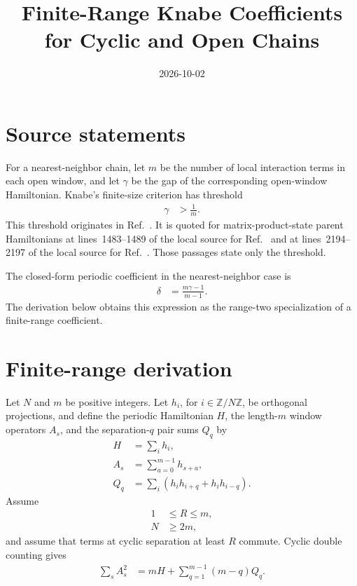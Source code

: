 \documentclass{article}
\title{Finite-Range Knabe Coefficients for Cyclic and Open Chains}
\author{}
\date{2026-10-02}
\begin{document}
\maketitle
{}

\section{Source statements}

For a nearest-neighbor chain, let $m$ be the number of local interaction
terms in each open window, and let $\gamma$ be the gap of the corresponding
open-window Hamiltonian. Knabe's finite-size criterion has threshold
\begin{align}
    \gamma
        &>\frac{1}{m}.
    \label{eq:knabe88_finite_range_coefficient_knabe_threshold}
\end{align}
This threshold originates in Ref.~\cite{Knabe1988Energy}. It is quoted for
matrix-product-state parent Hamiltonians at lines~1483--1489 of the local
source for Ref.~\cite{PerezGarcia2007Matrix} and at lines~2194--2197 of the
local source for Ref.~\cite{Cirac2021Matrix}. Those passages state only the
threshold.

The closed-form periodic coefficient in the nearest-neighbor case is
\begin{align}
    \delta
        &=\frac{m\gamma-1}{m-1}.
    \label{eq:knabe88_finite_range_coefficient_nearest_neighbor_coefficient}
\end{align}
The derivation below obtains this expression as the range-two specialization
of a finite-range coefficient.

\section{Finite-range derivation}

Let $N$ and $m$ be positive integers. Let $h_i$, for
$i\in\mathbb Z/N\mathbb Z$, be orthogonal projections, and define the
periodic Hamiltonian $H$, the length-$m$ window operators $A_s$, and the
separation-$q$ pair sums $Q_q$ by
\begin{align}
    H
        &=\sum_i h_i,
    \label{eq:knabe88_finite_range_coefficient_periodic_hamiltonian}\\
    A_s
        &=\sum_{a=0}^{m-1}h_{s+a},
    \label{eq:knabe88_finite_range_coefficient_window_hamiltonian}\\
    Q_q
        &=\sum_i(h_i h_{i+q}+h_i h_{i-q}).
    \label{eq:knabe88_finite_range_coefficient_pair_sum}
\end{align}
Assume
\begin{align}
    1
        &\leq R\leq m,
    \label{eq:knabe88_finite_range_coefficient_range_bounds}\\
    N
        &\geq2m,
    \label{eq:knabe88_finite_range_coefficient_cycle_size}
\end{align}
and assume that terms at cyclic separation at least $R$ commute. Cyclic
double counting gives
\begin{align}
    \sum_s A_s^2
        &=mH+\sum_{q=1}^{m-1}(m-q)Q_q.
    \label{eq:knabe88_finite_range_coefficient_window_square_sum}
\end{align}
\end{document}
